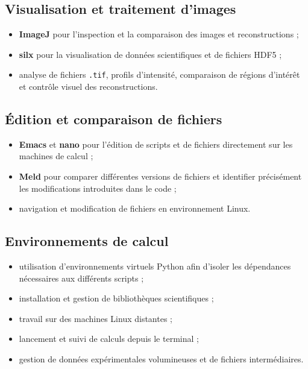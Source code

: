 \documentclass[11pt,a4paper]{report}
\begin{document}
\subsection{Visualisation et traitement d'images}

\begin{itemize}
    \item \textbf{ImageJ} pour l'inspection et la comparaison des images et
    reconstructions ;
    
    \item \textbf{silx} pour la visualisation de données scientifiques et
    de fichiers HDF5 ;
    
    \item analyse de fichiers \texttt{.tif}, profils d'intensité,
    comparaison de régions d'intérêt et contrôle visuel des reconstructions.
\end{itemize}

\subsection{Édition et comparaison de fichiers}

\begin{itemize}
    \item \textbf{Emacs} et \textbf{nano} pour l'édition de scripts et de
    fichiers directement sur les machines de calcul ;
    
    \item \textbf{Meld} pour comparer différentes versions de fichiers et
    identifier précisément les modifications introduites dans le code ;
    
    \item navigation et modification de fichiers en environnement Linux.
\end{itemize}

\subsection{Environnements de calcul}

\begin{itemize}
    \item utilisation d'environnements virtuels Python afin d'isoler les
    dépendances nécessaires aux différents scripts ;
    
    \item installation et gestion de bibliothèques scientifiques ;
    
    \item travail sur des machines Linux distantes ;
    
    \item lancement et suivi de calculs depuis le terminal ;
    
    \item gestion de données expérimentales volumineuses et de fichiers
    intermédiaires.
\end{itemize}
\end{document}
